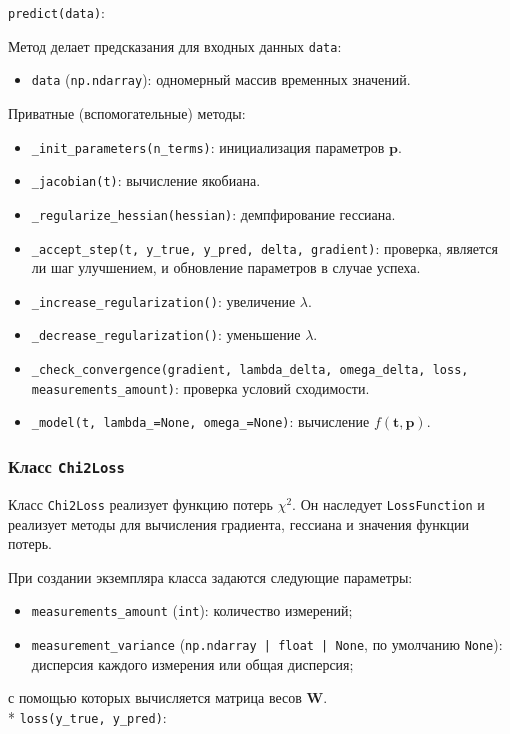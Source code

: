 \texttt{predict(data)}:

Метод делает предсказания для входных данных \texttt{data}:
\begin{itemize}
	\item \texttt{data} (\texttt{np.ndarray}): одномерный массив временных значений.
\end{itemize}

Приватные (вспомогательные) методы:

\begin{itemize}
	\item \texttt{\_init\_parameters(n\_terms)}: инициализация параметров $\mathbf{p}$.
	\item \texttt{\_jacobian(t)}: вычисление якобиана.
	\item \texttt{\_regularize\_hessian(hessian)}: демпфирование гессиана.
	\item \texttt{\_accept\_step(t, y\_true, y\_pred, delta, gradient)}: проверка, является ли шаг улучшением, и обновление параметров в случае успеха.
	\item \texttt{\_increase\_regularization()}: увеличение $\lambda$.
	\item \texttt{\_decrease\_regularization()}: уменьшение $\lambda$.
	\item \texttt{\_check\_convergence(gradient, lambda\_delta, omega\_delta, loss, measurements\_amount)}: проверка условий сходимости.
	\item \texttt{\_model(t, lambda\_=None, omega\_=None)}: вычисление $f(\mathbf{t}, \mathbf{p})$.
\end{itemize}


\subsubsection{Класс \texttt{Chi2Loss}}

Класс \texttt{Chi2Loss} реализует функцию потерь $\chi^2$. Он наследует \linebreak \texttt{LossFunction} и реализует методы для вычисления градиента, гессиана и значения функции потерь.

При создании экземпляра класса задаются следующие параметры:
\begin{itemize}
	\item \texttt{measurements\_amount} (\texttt{int}): количество измерений;
	\item \texttt{measurement\_variance} (\texttt{np.ndarray | float | None},  по умолчанию \texttt{None}): дисперсия каждого измерения или общая дисперсия;
\end{itemize}
с помощью которых вычисляется матрица весов $\mathbf{W}$.
\\*
\texttt{loss(y\_true, y\_pred)}:

